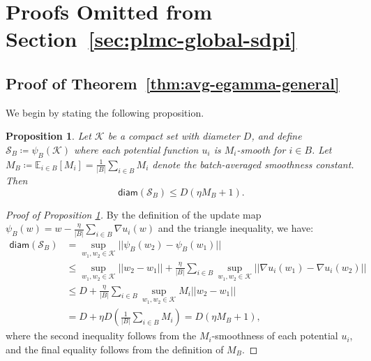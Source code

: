 \documentclass[10pt, journal]{IEEEtran}
\newtheorem{proposition}{Proposition}
\begin{document}
 
\section{Proofs Omitted from Section~\ref{sec:plmc-global-sdpi}}

\subsection{Proof of Theorem~\ref{thm:avg-egamma-general}}
\label{Appendix_Egamma_PLMC}
We begin by stating the following proposition. 

\begin{proposition}
\label{prop_diameter}
Let $\mathcal{K}$ be a compact set with diameter $D$, and define $\mathcal{S}_B \coloneqq \psi_B(\mathcal{K})$ where each potential function $u_i$ is $M_i$-smooth for $i \in B$. Let $M_B \coloneqq \mathbb{E}_{i \in B} [M_i] = \frac{1}{|B|} \sum_{i \in B} M_i$ denote the batch-averaged smoothness constant. Then$$\mathsf{diam}(\mathcal{S}_B) \le D(\eta M_B + 1).$$
\end{proposition}
\begin{proof}[Proof of Proposition \ref{prop_diameter}]

By the definition of the update map $\psi_B(w) = w - \frac{\eta}{|B|} \sum_{i \in B} \nabla u_i(w)$ and the triangle inequality, we have:
\begin{align}
\mathsf{diam}(\mathcal{S}_B) &= \sup_{w_1,w_2 \in \mathcal{K}} ||\psi_B(w_2) -\psi_B(w_1)|| \nonumber\\
&\le \sup_{w_1, w_2 \in \mathcal{K}} ||w_2 - w_1|| + \frac{\eta}{|B|} \sum_{i \in B} \sup_{w_1, w_2 \in \mathcal{K}} ||\nabla u_i(w_1) - \nabla u_i(w_2)|| \nonumber\\
&\le D + \frac{\eta}{|B|} \sum_{i \in B} \sup_{w_1, w_2 \in \mathcal{K}} M_i ||w_2 - w_1|| \nonumber\\
&= D + \eta D \left( \frac{1}{|B|} \sum_{i \in B} M_i \right) = D(\eta M_B + 1), \nonumber
\end{align}
where the second inequality follows from the $M_i$-smoothness of each potential $u_i$, and the final equality follows from the definition of $M_B$.
\end{proof}
\end{document}
